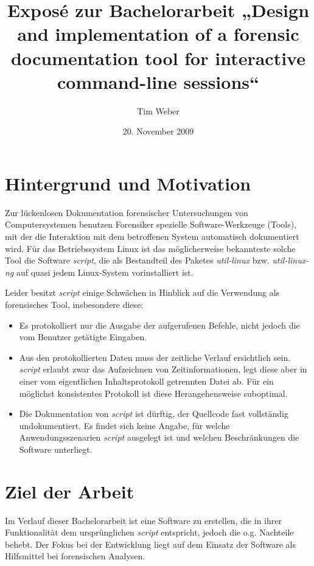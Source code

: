 

\author{Tim Weber}
\date{20. November 2009}
\title{Exposé zur Bachelorarbeit „Design and implementation of a forensic documentation tool for interactive command-line sessions“}


\maketitle

\section*{Hintergrund und Motivation}
Zur lückenlosen Dokumentation forensischer Untersuchungen von Computersystemen benutzen Forensiker spezielle Software-Werkzeuge (Tools), mit der die Interaktion mit dem betroffenen System automatisch dokumentiert wird.
Für das Betriebssystem Linux ist das möglicherweise bekannteste solche Tool die Software \emph{script}, die als Bestandteil des Paketes \emph{util-linux} bzw. \emph{util-linux-ng} auf quasi jedem Linux-System vorinstalliert ist.

Leider besitzt \emph{script} einige Schwächen in Hinblick auf die Verwendung als forensisches Tool, insbesondere diese:
\begin{itemize}
\item Es protokolliert nur die Ausgabe der aufgerufenen Befehle, nicht jedoch die vom Benutzer getätigte Eingaben.
\item Aus den protokollierten Daten muss der zeitliche Verlauf ersichtlich sein. \emph{script} erlaubt zwar das Aufzeichnen von Zeitinformationen, legt diese aber in einer vom eigentlichen Inhaltsprotokoll getrennten Datei ab. Für ein möglichst konsistentes Protokoll ist diese Herangehensweise suboptimal.
\item Die Dokumentation von \emph{script} ist dürftig, der Quellcode fast vollständig undokumentiert. Es findet sich keine Angabe, für welche Anwendungsszenarien \emph{script} ausgelegt ist und welchen Beschränkungen die Software unterliegt.
\end{itemize}

\section*{Ziel der Arbeit}
Im Verlauf dieser Bachelorarbeit ist eine Software zu erstellen, die in ihrer Funktionalität dem ursprünglichen \emph{script} entspricht, jedoch die o.g. Nachteile behebt.
Der Fokus bei der Entwicklung liegt auf dem Einsatz der Software als Hilfsmittel bei forensischen Analysen.

